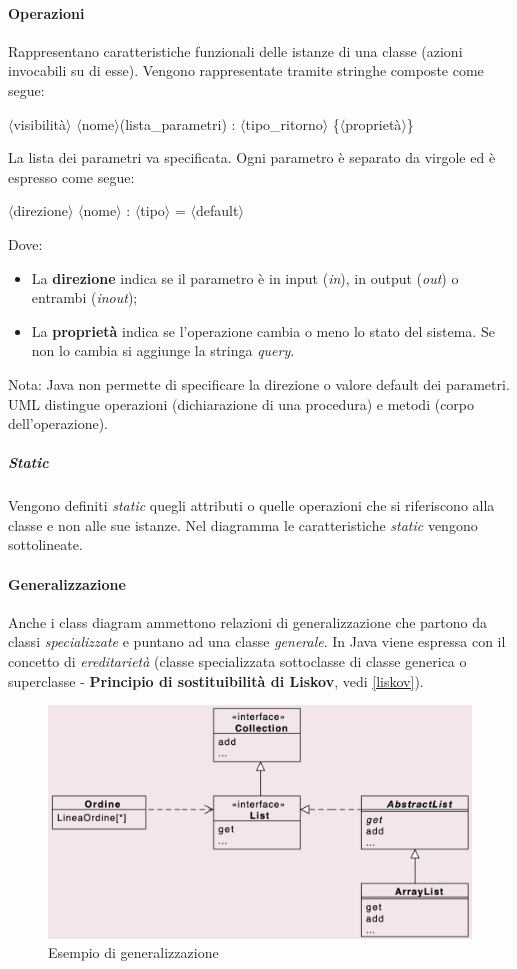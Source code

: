 \newpage
\paragraph{Operazioni} Rappresentano caratteristiche funzionali delle istanze di una classe (azioni invocabili su di esse). Vengono rappresentate tramite stringhe composte come segue:
\begin{center}
        $\langle$visibilità$\rangle$ $\langle$nome$\rangle$(lista\_parametri) : $\langle$tipo\_ritorno$\rangle$ \{$\langle$proprietà$\rangle$\}
\end{center}
La lista dei parametri va specificata. Ogni parametro è separato da virgole ed è espresso come segue:
\begin{center}
        $\langle$direzione$\rangle$ $\langle$nome$\rangle$ : $\langle$tipo$\rangle$ = $\langle$default$\rangle$
\end{center}
Dove:
\begin{itemize}
    \item La \textbf{direzione} indica se il parametro è in input (\textit{in}), in output (\textit{out}) o entrambi (\textit{inout});
    \item La \textbf{proprietà} indica se l'operazione cambia o meno lo stato del sistema. Se non lo cambia si aggiunge la stringa \textit{query}.
\end{itemize}
Nota: Java non permette di specificare la direzione o valore default dei parametri.
UML distingue operazioni (dichiarazione di una procedura) e metodi (corpo dell'operazione).

\subparagraph{Static} Vengono definiti \textit{static} quegli attributi o quelle operazioni che si riferiscono alla classe e non alle sue istanze. Nel diagramma le caratteristiche \textit{static} vengono sottolineate.

\paragraph{Generalizzazione} Anche i class diagram ammettono relazioni di generalizzazione che partono da classi \textit{specializzate} e puntano ad una classe \textit{generale}. In Java viene espressa con il concetto di \textit{ereditarietà} (classe specializzata sottoclasse di classe generica o superclasse - \textbf{Principio di sostituibilità di Liskov}, vedi \ref{liskov}).

\begin{figure}[h!]
    \centering
    \includegraphics[width=0.75\linewidth]{assets/UML/class/class-8.png}
    \caption{Esempio di generalizzazione}
\end{figure}

